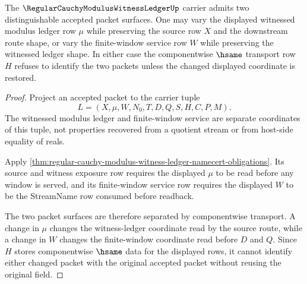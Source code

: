 \begin{theorem}
\label{thm:regular-cauchy-modulus-witness-ledger-nontrivial-witness-surface}
The $\RegularCauchyModulusWitnessLedgerUp$ carrier admits two distinguishable accepted packet surfaces. One may vary the displayed witnessed modulus ledger row $\mu$ while preserving the source row $X$ and the downstream route shape, or vary the finite-window service row $W$ while preserving the witnessed ledger shape. In either case the componentwise $\hsame$ transport row $H$ refuses to identify the two packets unless the changed displayed coordinate is restored.
\end{theorem}
\begin{proof}
Project an accepted packet to the carrier tuple
$$
L=(X,\mu,W,N_0,T,D,Q,S,H,C,P,M).
$$
The witnessed modulus ledger and finite-window service are separate coordinates of this tuple, not properties recovered from a quotient stream or from host-side equality of reals.

Apply \autoref{thm:regular-cauchy-modulus-witness-ledger-namecert-obligations}. Its source and witness exposure row requires the displayed $\mu$ to be read before any window is served, and its finite-window service row requires the displayed $W$ to be the StreamName row consumed before readback.

The two packet surfaces are therefore separated by componentwise transport. A change in $\mu$ changes the witness-ledger coordinate read by the source route, while a change in $W$ changes the finite-window coordinate read before $D$ and $Q$. Since $H$ stores componentwise $\hsame$ data for the displayed rows, it cannot identify either changed packet with the original accepted packet without reusing the original field.
\end{proof}


